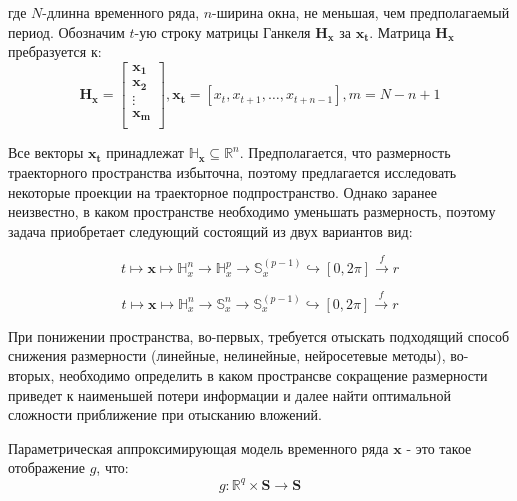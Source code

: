 \documentclass[12pt,twoside]{article}
\begin{document}
                   
где $N$-длинна временного ряда, $n$-ширина окна, не меньшая, чем предполагаемый период. Обозначим $t$-ую строку матрицы Ганкеля $\mathbf{H_{x}}$ за $\mathbf{x_{t}}$. Матрица $\mathbf{H_{x}}$ пребразуется к:	
\begin{equation}
	\mathbf{H_{x}} = 
	\begin{bmatrix} 
                  	\mathbf{x_{1}}\\ \mathbf{x_{2}}\\
                  	\vdots\\
                  	\mathbf{x_{m}}\\
                   \end{bmatrix},
                   \mathbf{x_t}=[x_{t},x_{t+1},\ldots,x_{t+n-1}] ,
                   m = N-n+1
\label{eq:hankel_matrix_2}
\end{equation}
\vspace{\baselineskip}

Все векторы $\mathbf{x_{t}}$ принадлежат $\mathbb{H}_{\mathbf{x}} \subseteq \mathbb{R}^{n}$. Предполагается, что размерность траекторного пространства избыточна, поэтому предлагается исследовать некоторые проекции на траекторное подпространство.
Однако заранее неизвестно, в каком пространстве необходимо уменьшать размерность, поэтому задача приобретает следующий состоящий из двух вариантов вид:

\begin{equation}
	t \mapsto \mathbf{x} \mapsto \mathbb{H}_{x}^{n} \xrightarrow{} \mathbb{H}_{x}^{p} \xrightarrow{} \mathbb{S}_x^{(p-1)} \hookrightarrow [0,2\pi] \xrightarrow{f} r
\label{eq:goal}
\end{equation}

\begin{equation}
	t \mapsto \mathbf{x} \mapsto \mathbb{H}_{x}^{n} \xrightarrow{} \mathbb{S}_{x}^{n} \xrightarrow{} \mathbb{S}_x^{(p-1)} \hookrightarrow [0,2\pi] \xrightarrow{f} r
\label{eq:goal_2}
\end{equation}
\vspace{\baselineskip}

При понижении пространства, во-первых, требуется отыскать подходящий способ снижения размерности (линейные, нелинейные, нейросетевые методы), во-вторых, необходимо определить в каком пространсве сокращение размерности приведет к наименьшей потери информации и далее найти оптимальной сложности приближение при отысканию вложений. 
\vspace{\baselineskip}

\begin{Def}
Параметрическая аппроксимирующая модель временного ряда  $\mathbf{x}$  - это такое отображение $g$, что:
\begin{equation} g: \mathbb{R}^{q} \times \mathbf{S} \xrightarrow{} \mathbf{S}
\label{eq:param_model}
\end{equation}
\end{Def}
\end{document}

